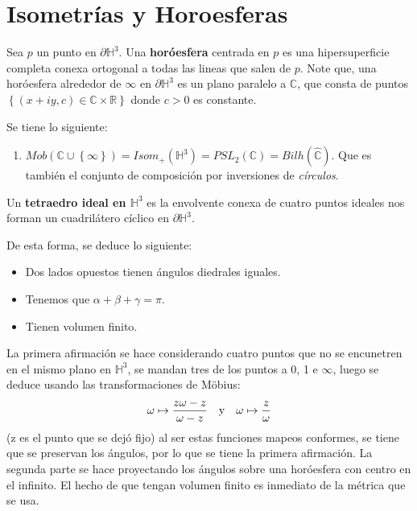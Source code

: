 \documentclass[12pt]{report}
\theoremstyle{largebreak}
\begin{document}
    \section{Isometrías y Horoesferas}

    Sea $p$ un punto en $\partial\mathbb{H}^3$. Una \textbf{horóesfera} centrada en $p$ es una hipersuperficie completa conexa ortogonal a todas las lineas que salen de $p$. Note que, una horóesfera alrededor de $\infty$ en $\partial\mathbb{H}^3$ es un plano paralelo a $\mathbb{C}$, que consta de puntos $\left\{(x+iy,c)\in\mathbb{C}\times\mathbb{R} \right\}$ donde $c>0$ es constante.

    \begin{obs}
        Se tiene lo siguiente:
        \begin{enumerate}
            \item $Mob(\mathbb{C}\cup\left\{\infty\right\})=Isom_{ +}(\mathbb{H}^3)=PSL_2(\mathbb{C})=Bilh(\hat{\mathbb{C}})$. Que es también el conjunto de composición por inversiones de \textit{círculos}.
        \end{enumerate}
    \end{obs}

    Un \textbf{tetraedro ideal en $\mathbb{H}^3$} es la envolvente conexa de cuatro puntos ideales nos forman un cuadrilátero cíclico en $\partial\mathbb{H}^3$.

    De esta forma, se deduce lo siguiente:
    \begin{itemize}
        \item Dos lados opuestos tienen ángulos diedrales iguales.
        \item Tenemos que $\alpha+\beta+\gamma=\pi$.
        \item Tienen volumen finito.
    \end{itemize}
    
    La primera afirmación se hace considerando cuatro puntos que no se encunetren en el mismo plano en $\mathbb{H}^3$, se mandan tres de los puntos a 0, 1 e $\infty$, luego se deduce usando las transformaciones de Möbius:
    \begin{equation*}
        \omega\mapsto\frac{z\omega-z}{\omega-z}\quad\textup{y}\quad \omega\mapsto\frac{z}{\omega}
    \end{equation*}
    (z es el punto que se dejó fijo) al ser estas funciones mapeos conformes, se tiene que se preservan los ángulos, por lo que se tiene la primera afirmación. La segunda parte se hace proyectando los ángulos sobre una horóesfera con centro en el infinito. El hecho de que tengan volumen finito es inmediato de la métrica que se usa.
\end{document}
